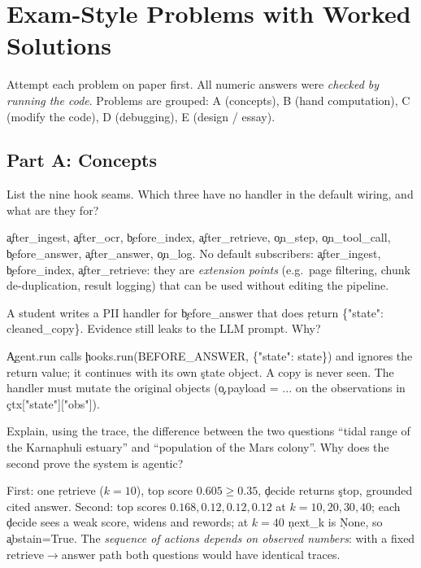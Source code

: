 \chapter{Exam-Style Problems with Worked Solutions}\label{ch:problems}
Attempt each problem on paper first. All numeric answers were \emph{checked by running the code}. Problems are grouped: A (concepts), B (hand computation), C (modify the code), D (debugging), E (design / essay).

\section*{Part A: Concepts}
\begin{problem}[Seams]
List the nine hook seams. Which three have no handler in the default wiring, and what are they for?
\end{problem}
\begin{solution}
\c{after\_ingest}, \c{after\_ocr}, \c{before\_index}, \c{after\_retrieve}, \c{on\_step}, \c{on\_tool\_call}, \c{before\_answer}, \c{after\_answer}, \c{on\_log}. No default subscribers: \c{after\_ingest}, \c{before\_index}, \c{after\_retrieve}: they are \emph{extension points} (e.g.\ page filtering, chunk de-duplication, result logging) that can be used without editing the pipeline.
\end{solution}

\begin{problem}
A student writes a PII handler for \c{before\_answer} that does \c{return \{"state": cleaned\_copy\}}. Evidence still leaks to the LLM prompt. Why?
\end{problem}
\begin{solution}
\c{Agent.run} calls \c{hooks.run(BEFORE\_ANSWER, \{"state": state\})} and ignores the return value; it continues with its own \c{state} object. A copy is never seen. The handler must mutate the original objects (\c{o.payload = ...} on the observations in \c{ctx["state"]["obs"]}).
\end{solution}

\begin{problem}
Explain, using the trace, the difference between the two questions ``tidal range of the Karnaphuli estuary'' and ``population of the Mars colony''. Why does the second prove the system is agentic?
\end{problem}
\begin{solution}
First: one \c{retrieve} ($k{=}10$), top score $0.605\ge0.35$, \c{decide} returns \c{stop}, grounded cited answer. Second: top scores $0.168,0.12,0.12,0.12$ at $k=10,20,30,40$; each \c{decide} sees a weak score, widens and rewords; at $k=40$ \c{next\_k} is \c{None}, so \c{abstain=True}. The \emph{sequence of actions depends on observed numbers}: with a fixed retrieve$\to$answer path both questions would have identical traces.
\end{solution}

